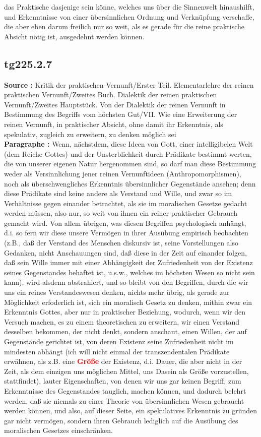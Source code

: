 \documentclass[a4paper,12pt,twoside]{book}
\newcommand{\match}[1]{\textcolor{red}{\textbf{#1}}}
\begin{document}
das Praktische dasjenige sein könne, welches uns über die Sinnenwelt hinaushilft, und Erkenntnisse von einer übersinnlichen Ordnung und Verknüpfung verschaffe, die aber eben darum freilich nur so weit, als es gerade für die reine praktische Absicht nötig ist, ausgedehnt werden können. 
	
	\subsection*{tg225.2.7} 
	\textbf{Source : }Kritik der praktischen Vernunft/Erster Teil. Elementarlehre der reinen praktischen Vernunft/Zweites Buch. Dialektik der reinen praktischen Vernunft/Zweites Hauptstück. Von der Dialektik der reinen Vernunft in Bestimmung des Begriffs vom höchsten Gut/VII. Wie eine Erweiterung der reinen Vernunft, in praktischer Absicht, ohne damit ihr Erkenntnis, als spekulativ, zugleich zu erweitern, zu denken möglich sei\\  
	
	\noindent\textbf{Paragraphe : }
	Wenn, nächstdem, diese Ideen von Gott, einer intelligibelen Welt (dem Reiche Gottes) und der Unsterblichkeit durch Prädikate bestimmt werten, die von unserer eigenen Natur hergenommen sind, so darf man diese Bestimmung weder als Versinnlichung jener reinen Vernunftideen (Anthropomorphismen), noch als überschwengliches Erkenntnis übersinnlicher Gegenstände ansehen; denn diese Prädikate sind keine andere als Verstand und Wille, und zwar so im Verhältnisse gegen einander betrachtet, als sie im moralischen Gesetze gedacht werden müssen, also nur, so weit von ihnen ein reiner praktischer Gebrauch gemacht wird. Von allem übrigen, was diesen Begriffen psychologisch anhängt, d.i. so fern wir diese unsere Vermögen in ihrer Ausübung empirisch beobachten (z.B., daß der Verstand des Menschen diskursiv ist, seine Vorstellungen also Gedanken, nicht Anschauungen sind, daß diese in der Zeit auf einander folgen, daß sein Wille immer mit einer Abhängigkeit der Zufriedenheit von der Existenz seines Gegenstandes behaftet ist, u.s.w., welches im höchsten Wesen so nicht sein kann), wird alsdenn abstrahiert, und so bleibt von den Begriffen, durch die wir uns ein reines Verstandeswesen denken, nichts mehr übrig, als gerade zur Möglichkeit erfoderlich ist, sich ein moralisch Gesetz zu denken, mithin zwar ein Erkenntnis Gottes, aber nur in praktischer Beziehung, wodurch, wenn wir den Versuch machen, es zu einem theoretischen zu erweitern, wir einen Verstand desselben bekommen, der nicht denkt, sondern anschaut, einen Willen, der auf Gegenstände gerichtet ist, von deren Existenz seine Zufriedenheit nicht im mindesten abhängt (ich will nicht einmal der transzendentalen Prädikate erwähnen, als z.B. eine \match{Größe} der Existenz, d.i. Dauer, die aber nicht in der Zeit, als dem einzigen uns möglichen Mittel, uns Dasein als Größe vorzustellen, stattfindet), lauter Eigenschaften, von denen wir uns gar keinen Begriff, zum Erkenntnisse des Gegenstandes tauglich, machen können, und dadurch belehrt werden, daß sie niemals zu einer Theorie von übersinnlichen Wesen gebraucht werden können, und also, auf dieser Seite, ein spekulatives Erkenntnis zu  gründen gar nicht vermögen, sondern ihren Gebrauch lediglich auf die Ausübung des moralischen Gesetzes einschränken. 
	
\end{document}
